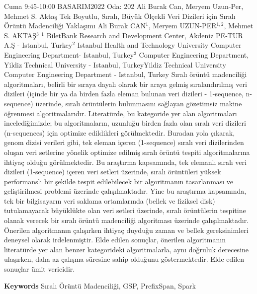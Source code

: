 
    \begin{abstract_basarim}
    {Cuma 9:45-10:00}
    {BASARIM2022}
    {Oda: 202}
    {Ali Burak Can, Meryem Uzun-Per, Mehmet S. Aktaş}
    {Tek Boyutlu, Sıralı, Büyük Ölçekli Veri Dizileri için Sıralı Örüntü Madenciliği Yaklaşımı}
    {%
    Ali Burak CAN$^{1}$, Meryem UZUN-PER$^{1,2}$, Mehmet S. AKTAŞ$^{3}$}
    {%
    }
    {%
    $^1$ BiletBank Research and Development Center, Akdeniz PE-TUR A.Ş - Istanbul, Turkey\newline{}$^2$ Istanbul Health and Technology University Computer Engineering Department- Istanbul, Turkey\newline{}$^3$ Computer Engineering Department, Yildiz Technical University - Istanbul, TurkeyYildiz Technical University Computer Engineering Department - Istanbul, Turkey}
    Sıralı örüntü madenciliği algoritmaları, belirli bir sıraya dayalı olarak bir araya gelmiş sıralandırılmış veri dizileri (içinde bir ya da birden fazla eleman bulunan veri dizileri - 1-sequence, n-sequence) üzerinde, sıralı örüntülerin bulunmasını sağlayan gözetimsiz makine öğrenmesi algoritmalarıdır. Literatürde, bu kategoride yer alan algoritmaları incelediğimizde; bu algoritmaların, uzunluğu birden fazla olan sıralı veri dizileri (n-sequences) için optimize edildikleri görülmektedir. Buradan yola çıkarak, genom dizisi verileri gibi, tek eleman içeren (1-sequence) sıralı veri dizilerinden oluşan veri setlerine yönelik optimize edilmiş sıralı örüntü tespiti algoritmalarına ihtiyaç olduğu görülmektedir. Bu araştırma kapsamında, tek elemanlı sıralı veri dizileri (1-sequence) içeren veri setleri üzerinde, sıralı örüntüleri yüksek performanslı bir şekilde tespit edilebilecek bir algoritmanın tasarlanması ve geliştirilmesi problemi üzerinde çalışılmaktadır. Yine bu araştırma kapsamında, tek bir bilgisayarın veri saklama ortamlarında (bellek ve fiziksel disk) tutulamayacak büyüklükte olan veri setleri üzerinde, sıralı örüntülerin tespitine olanak verecek bir sıralı örüntü madenciliği algoritması üzerinde çalışılmaktadır. Önerilen algoritmanın çalışırken ihtiyaç duyduğu zaman ve bellek gereksinimleri deneysel olarak irdelenmiştir. Elde edilen sonuçlar, önerilen algoritmanın literatürde yer alan benzer kategorideki algoritmalarla, aynı doğruluk derecesine ulaşırken, daha az çalışma süresine sahip olduğunu göstermektedir. Elde edilen sonuçlar ümit vericidir. 
    
        \textbf{Keywords} \newline{}Sıralı Örüntü Madenciliği, GSP, PrefixSpan, Spark
    \end{abstract_basarim}
    